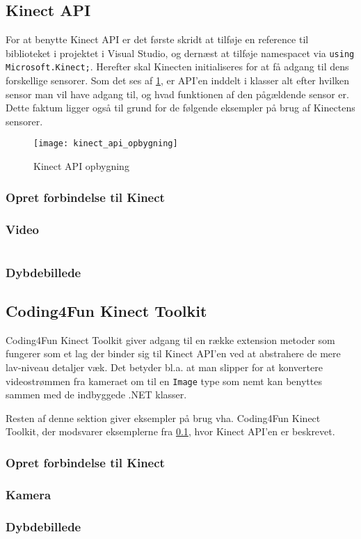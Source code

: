 \subsection{Kinect API}\label{kinect:kinectapi}
For at benytte Kinect API er det første skridt at tilføje en reference til biblioteket i projektet i Visual Studio, og dernæst at tilføje namespacet via \lstinline!using Microsoft.Kinect;!.
Herefter skal Kinecten initialiseres for at få adgang til dens forskellige sensorer. Som det ses af \cref{kinect:apiopbygning}, er API'en inddelt i klasser alt efter hvilken sensor man vil have adgang til, og hvad funktionen af den pågældende sensor er.
Dette faktum ligger også til grund for de følgende eksempler på brug af Kinectens sensorer.

\begin{figure}
\centering
\texttt{[image: kinect\_api\_opbygning]}
\caption{Kinect API opbygning }
\label{kinect:apiopbygning}
\end{figure}


\subsubsection{Opret forbindelse til Kinect}

\subsubsection{Video}

\begin{lstlisting}[style=csharp,caption={Kinect SDK kamera},label=kinect:sdk-kamera]

\end{lstlisting}

\subsubsection{Dybdebillede}


\subsection{Coding4Fun Kinect Toolkit}
Coding4Fun Kinect Toolkit giver adgang til en række extension metoder som fungerer som et lag der binder sig til Kinect API'en ved at abstrahere de mere lav-niveau detaljer væk. Det betyder bl.a. at man slipper for at konvertere videostrømmen fra kameraet om til en \lstinline!Image! type som nemt kan benyttes sammen med de indbyggede .NET klasser.

Resten af denne sektion giver eksempler på brug vha. Coding4Fun Kinect Toolkit, der modsvarer eksemplerne fra \cref{kinect:kinectapi}, hvor Kinect API'en er beskrevet.

\subsubsection{Opret forbindelse til Kinect}

\subsubsection{Kamera}

\subsubsection{Dybdebillede}